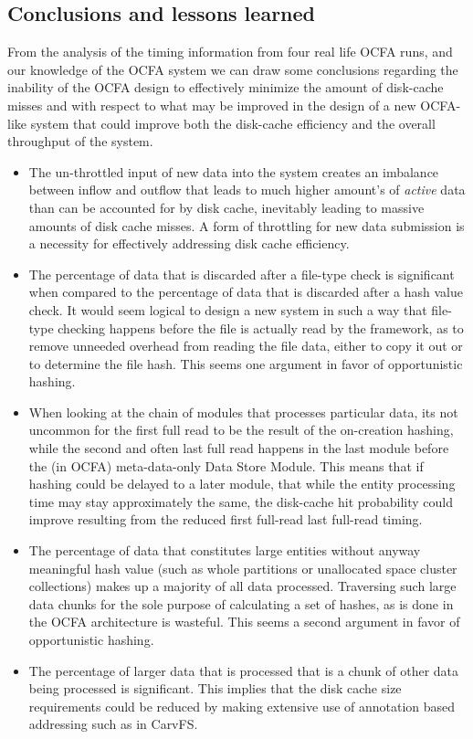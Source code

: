 \subsection{Conclusions and lessons learned}
From the analysis of the timing information from four real life OCFA runs, and our knowledge of the OCFA system we can draw some conclusions regarding the inability of the OCFA design to effectively minimize the amount of disk-cache misses and with respect to what may be improved in the design of a new OCFA-like system that could improve both the disk-cache efficiency and the overall throughput of the system.
\begin{itemize}
\item The un-throttled input of new data into the system creates an imbalance between inflow and outflow that leads to much higher amount's of \emph{active} data than can be accounted for by disk cache, inevitably leading to massive amounts of disk cache misses. A form of throttling for new data submission is a necessity for effectively addressing disk cache efficiency.
\item The percentage of data that is discarded after a file-type check is significant when compared to the percentage of data that is discarded after a hash value check. It would seem logical to design a new system in such a way that file-type checking happens before the file is actually read by the framework, as to remove unneeded overhead from reading the file data, either to copy it out or to determine the file hash. This seems one argument in favor of opportunistic hashing. 
\item When looking at the chain of modules that processes particular data, its not uncommon for the first full read to be the result of the on-creation hashing, while the second and often last full read happens in the last module before the (in OCFA) meta-data-only Data Store Module. This means that if hashing could be delayed to a later module, that while the entity processing time may stay approximately the same, the disk-cache hit probability could improve resulting from the reduced first full-read last full-read timing. 
\item The percentage of data that constitutes large entities without anyway meaningful hash value (such as whole partitions or unallocated space cluster collections) makes up a majority of all data processed. Traversing such large data chunks for the sole purpose of calculating a set of hashes, as is done in the OCFA architecture is wasteful. This seems a second argument in favor of opportunistic hashing.
\item The percentage of larger data that is processed that is a chunk of other data being processed is significant. This implies that the disk cache size requirements could be reduced by making extensive use of annotation based addressing such as in CarvFS.
\end{itemize}
